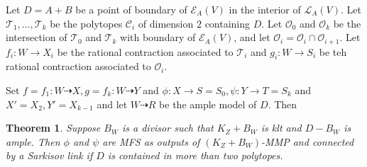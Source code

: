 \documentclass{article}
\newtheorem{thm}[defn]{Theorem}
\begin{document}
Let $ D=A+B $ be a point of boundary of $ \mathcal{E}_A(V) $ in the interior of $ \mathcal{L}_A(V) $. Let $ \mathcal{T}_1, \ldots, \mathcal{T}_k $ be the polytopes $ \mathcal{C}_i $ of dimension $ 2 $ containing $ D $. Let $ \mathcal{O}_0 $ and $ \mathcal{O}_k $ be the intersection of $ \mathcal{T}_0 $ and $ \mathcal{T}_k $ with boundary of $ \mathcal{E}_A(V) $, and let $ \mathcal{O}_i=\mathcal{O}_i\cap\mathcal{O}_{i+1} $. Let $ f_i:W\to X_i $ be the rational contraction associated to $ \mathcal{T}_i $ and $ g_i:W\to S_i $ be teh rational contraction associated to $ \mathcal{O}_i $.

Set $ f=f_1:W\dashrightarrow X, g=f_k:W\dashrightarrow Y $ and $ \phi:X\to S=S_0,\psi:Y\to T=S_k $ and $ X'=X_2,Y'=X_{k-1} $ and let $ W\dashrightarrow R $ be the ample model of $ D $. Then
\begin{thm}
	Suppose $ B_W $ is a divisor such that $ K_Z+B_W $ is klt and $ D-B_W $ is ample. Then $ \phi $ and $ \psi $ are MFS as outputs of $ (K_Z+B_W) $-MMP and connected by a Sarkisov link if $ D $ is contained in more than two polytopes.
\end{thm}
\end{document}
